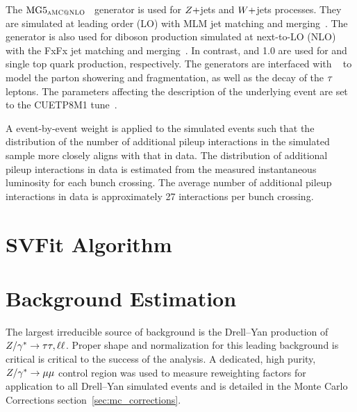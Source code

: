 The $\text{MG5}_\textsc{aMC@NLO}$~\cite{Alwall:2014hca} generator is used for $Z+$jets and $W+$jets processes. 
They are simulated at leading order (LO) with MLM jet matching and merging~\cite{Alwall:2007fs}.
The \aMCATNLO generator is also used for diboson production simulated at next-to-LO (NLO) with the 
FxFx jet matching and merging~\cite{Frederix:2012ps}. In contrast,  and 1.0 are used for \ttbar
and single top quark production, respectively. The generators are interfaced with  ~\cite{Sjostrand:2014zea} to model the parton showering and fragmentation, as well as 
the decay of the $\tau$ leptons. The \PYTHIA parameters affecting the description of the 
underlying event are set to the {CUETP8M1} tune~\cite{Khachatryan:2015pea}.

A event-by-event weight is applied to the simulated events such that the distribution of the 
number of additional pileup interactions in the simulated sample more closely aligns with that in data.
The distribution of additional pileup interactions in data is estimated from the measured instantaneous 
luminosity for each bunch crossing. The average number of additional pileup interactions in
data is approximately 27 interactions per bunch crossing.



\section{SVFit Algorithm}



\section{Background Estimation}
\label{sec:background_estimation}
The largest irreducible source of background is the Drell--Yan production
of $Z/\gamma^*\to\tau\tau, \ell\ell$. Proper shape and normalization for this
leading background is critical is critical to the success of the analysis.
A dedicated, high purity, $Z/\gamma^*\to\mu\mu$ control region was
used to measure reweighting factors for application to all Drell--Yan
simulated events and is detailed in the Monte Carlo Corrections 
section~\ref{sec:mc_corrections}.

